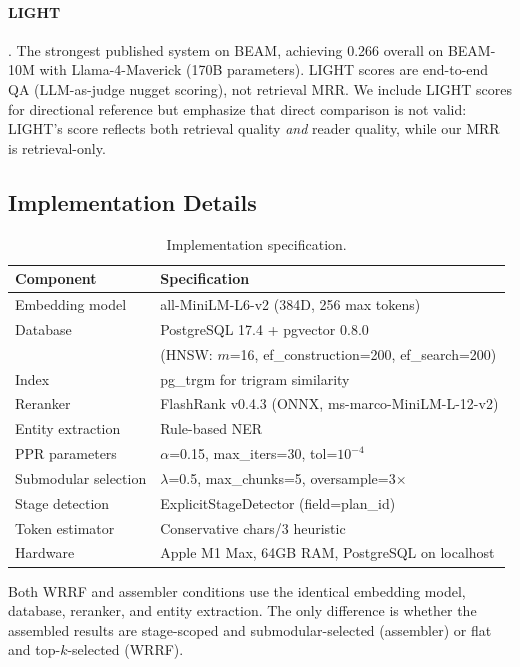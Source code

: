 \documentclass[11pt]{article}
\begin{document}
\paragraph{LIGHT} \citep{Tavakoli2026}.
The strongest published system on BEAM, achieving 0.266 overall on
BEAM-10M with Llama-4-Maverick (170B parameters).  LIGHT scores are
end-to-end QA (LLM-as-judge nugget scoring), not retrieval MRR.  We
include LIGHT scores for directional reference but emphasize that
direct comparison is not valid: LIGHT's score reflects both retrieval
quality \emph{and} reader quality, while our MRR is retrieval-only.

\subsection{Implementation Details}
\label{sec:impl-details}

\begin{table}[h]
\centering
\caption{Implementation specification.}
\label{tab:impl}
\small
\begin{tabular}{ll}
\toprule
Component & Specification \\
\midrule
Embedding model & all-MiniLM-L6-v2 (384D, 256 max tokens) \\
Database & PostgreSQL 17.4 + pgvector 0.8.0 \\
 & (HNSW: $m$=16, ef\_construction=200, ef\_search=200) \\
Index & pg\_trgm for trigram similarity \\
Reranker & FlashRank v0.4.3 (ONNX, ms-marco-MiniLM-L-12-v2) \\
Entity extraction & Rule-based NER \\
PPR parameters & $\alpha$=0.15, max\_iters=30, tol=$10^{-4}$ \\
Submodular selection & $\lambda$=0.5, max\_chunks=5, oversample=3$\times$ \\
Stage detection & ExplicitStageDetector (field=plan\_id) \\
Token estimator & Conservative chars/3 heuristic \\
Hardware & Apple M1 Max, 64GB RAM, PostgreSQL on localhost \\
\bottomrule
\end{tabular}
\end{table}

Both WRRF and assembler conditions use the identical embedding model,
database, reranker, and entity extraction.  The only difference is
whether the assembled results are stage-scoped and
submodular-selected (assembler) or flat and top-$k$-selected (WRRF).
\end{document}

